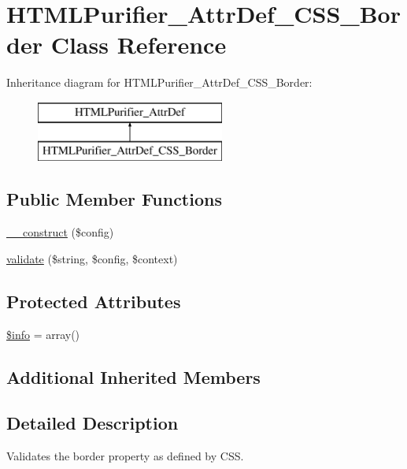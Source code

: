 \hypertarget{classHTMLPurifier__AttrDef__CSS__Border}{\section{H\+T\+M\+L\+Purifier\+\_\+\+Attr\+Def\+\_\+\+C\+S\+S\+\_\+\+Border Class Reference}
\label{classHTMLPurifier__AttrDef__CSS__Border}
}
Inheritance diagram for H\+T\+M\+L\+Purifier\+\_\+\+Attr\+Def\+\_\+\+C\+S\+S\+\_\+\+Border\+:\begin{figure}[H]
\begin{center}
\leavevmode
\includegraphics[height=2.000000cm]{classHTMLPurifier__AttrDef__CSS__Border}
\end{center}
\end{figure}
\subsection*{Public Member Functions}
\begin{DoxyCompactItemize}
\item 
\hyperlink{classHTMLPurifier__AttrDef__CSS__Border_ab212854484f59d82a3c280f7d4949b6b}{\+\_\+\+\_\+construct} (\$config)
\item 
\hyperlink{classHTMLPurifier__AttrDef__CSS__Border_a844bfa8c5106dd37f5e56f972b7cf9d9}{validate} (\$string, \$config, \$context)
\end{DoxyCompactItemize}
\subsection*{Protected Attributes}
\begin{DoxyCompactItemize}
\item 
\hyperlink{classHTMLPurifier__AttrDef__CSS__Border_aa9fb4d4dfd690be373acff02889c8096}{\$info} = array()
\end{DoxyCompactItemize}
\subsection*{Additional Inherited Members}


\subsection{Detailed Description}
Validates the border property as defined by C\+S\+S. 

